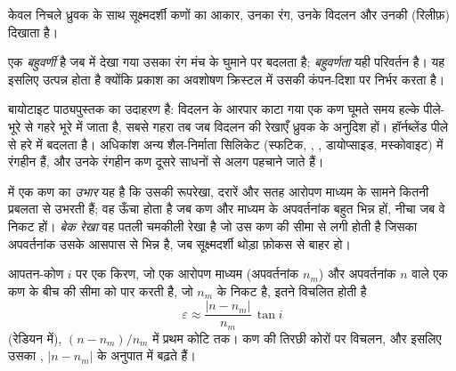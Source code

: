 केवल निचले ध्रुवक के साथ सूक्ष्मदर्शी कणों का आकार, उनका रंग, उनके विदलन और उनकी  (रिलीफ़) दिखाता है।

\begin{definition}[बहुवर्णता]\label{def:b1:optical-mineralogy:pleochroism}
एक  \emph{बहुवर्णी} है जब  में देखा गया उसका रंग मंच के घुमाने पर बदलता है;
\emph{बहुवर्णता} यही परिवर्तन है। यह इसलिए उत्पन्न होता है क्योंकि प्रकाश का अवशोषण क्रिस्टल में उसकी कंपन-दिशा पर निर्भर करता है।
\end{definition}

बायोटाइट पाठ्यपुस्तक का उदाहरण है: विदलन के आरपार काटा गया एक कण घूमते समय हल्के पीले-भूरे से गहरे भूरे में जाता है,
सबसे गहरा तब जब विदलन की रेखाएँ ध्रुवक के अनुदिश हों। हॉर्नब्लेंड पीले से हरे में बदलता है। अधिकांश अन्य शैल-निर्माता
सिलिकेट (स्फटिक, , , डायोप्साइड, मस्कोवाइट)  में रंगहीन हैं, और उनके रंगहीन कण दूसरे साधनों से
अलग पहचाने जाते हैं।

\begin{definition}[उभार (रिलीफ़), बेक रेखा]\label{def:b1:optical-mineralogy:relief}
 में एक कण का \emph{उभार} यह है कि उसकी रूपरेखा, दरारें और सतह आरोपण माध्यम के सामने
कितनी प्रबलता से उभरती हैं; वह ऊँचा होता है जब कण और माध्यम के अपवर्तनांक बहुत भिन्न हों, नीचा जब वे निकट हों।
\emph{बेक रेखा} वह पतली चमकीली रेखा है जो उस कण की सीमा से लगी होती है जिसका अपवर्तनांक उसके आसपास
से भिन्न है, जब सूक्ष्मदर्शी थोड़ा फ़ोकस से बाहर हो।
\end{definition}

\begin{proposition}[उभार और अपवर्तनांक]\label{prop:b1:optical-mineralogy:relief}
आपतन-कोण $i$ पर एक किरण, जो एक आरोपण माध्यम (अपवर्तनांक $n_m$) और अपवर्तनांक $n$ वाले एक कण के
बीच की सीमा को पार करती है, जो $n_m$ के निकट है, इतने विचलित होती है
\[
  \varepsilon \approx \frac{|n - n_m|}{n_m}\,\tan i
\]
(रेडियन में), $(n - n_m)/n_m$ में प्रथम कोटि तक। कण की तिरछी कोरों पर विचलन, और इसलिए उसका , $|n - n_m|$ के
अनुपात में बढ़ते हैं।
\end{proposition}

